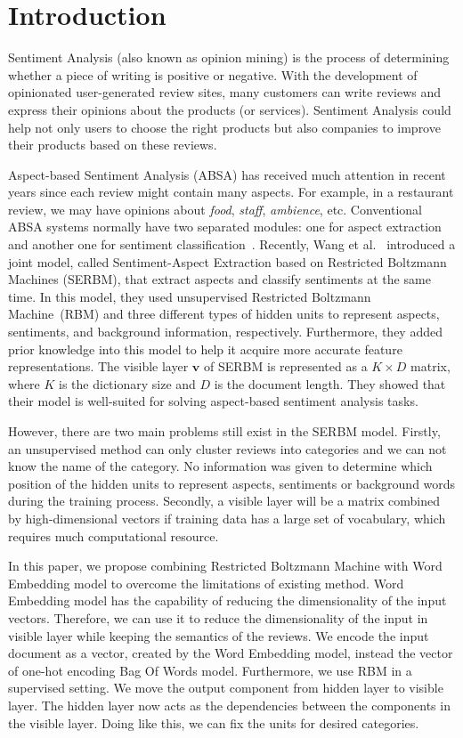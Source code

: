 \section{Introduction} \label{introduction}
Sentiment Analysis (also known as opinion mining) is the process of determining whether a piece of writing is positive or negative.
With the development of opinionated user-generated review sites, many customers can write reviews and express their opinions about the products (or services).
Sentiment Analysis could help not only users to choose the right products but also companies to improve their products based on these reviews.

Aspect-based Sentiment Analysis (ABSA) has received much attention in recent years since each review might contain many aspects.
For example, in a restaurant review, we may have opinions about \textit{food}, \textit{staff}, \textit{ambience}, etc.
Conventional ABSA systems normally have two separated modules: one for aspect extraction and another one for sentiment classification~\cite{bingliu,google,WebUserAnalysis_kumar}.
Recently, Wang et al.~\cite{serbm} introduced a joint model, called Sentiment-Aspect Extraction based on Restricted Boltzmann Machines (SERBM), that extract aspects and classify sentiments at the same time.
In this model, they used unsupervised Restricted Boltzmann Machine~(RBM) and three different types of hidden units to represent aspects, sentiments, and background information, respectively.
Furthermore, they added prior knowledge into this model to help it acquire more accurate feature representations.
The visible layer $\textbf{v}$ of SERBM is represented as a $K \times D$ matrix, where $K$ is the dictionary size and $D$ is the document length.
They showed that their model is well-suited for solving aspect-based sentiment analysis tasks.

However, there are two main problems still exist in the SERBM model.
Firstly, an unsupervised method can only cluster reviews into categories and we can not know the name of the category.
No information was given to determine which position of the hidden units to represent aspects, sentiments or background words during the training process.
Secondly, a visible layer will be a matrix combined by high-dimensional vectors if training data has a large set of vocabulary, which requires much computational resource.

In this paper, we propose combining Restricted Boltzmann Machine with Word Embedding model to overcome the limitations of existing method.
Word Embedding model has the capability of reducing the dimensionality of the input vectors.
Therefore, we can use it to reduce the dimensionality of the input in visible layer while keeping the semantics of the reviews.
We encode the input document as a vector, created by the Word Embedding model, instead the vector of one-hot encoding Bag Of Words model.
Furthermore, we use RBM in a supervised setting.
We move the output component from hidden layer to visible layer.
The hidden layer now acts as the dependencies between the components in the visible layer.
Doing like this, we can fix the units for desired categories.

